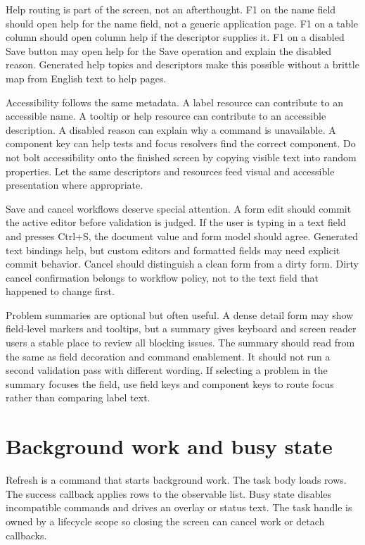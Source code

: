 Help routing is part of the screen, not an afterthought. F1 on the name field
should open help for the name field, not a generic application page. F1 on a
table column should open column help if the descriptor supplies it. F1 on a
disabled Save button may open help for the Save operation and explain the
disabled reason. Generated help topics and descriptors make this possible
without a brittle map from English text to help pages.

Accessibility follows the same metadata. A label resource can contribute to an
accessible name. A tooltip or help resource can contribute to an accessible
description. A disabled reason can explain why a command is unavailable. A
component key can help tests and focus resolvers find the correct component.
Do not bolt accessibility onto the finished screen by copying visible text into
random properties. Let the same descriptors and resources feed visual and
accessible presentation where appropriate.

Save and cancel workflows deserve special attention. A form edit should commit
the active editor before validation is judged. If the user is typing in a text
field and presses Ctrl+S, the document value and form model should agree.
Generated text bindings help, but custom editors and formatted fields may need
explicit commit behavior. Cancel should distinguish a clean form from a dirty
form. Dirty cancel confirmation belongs to workflow policy, not to the text
field that happened to change first.

Problem summaries are optional but often useful. A dense detail form may show
field-level markers and tooltips, but a summary gives keyboard and screen
reader users a stable place to review all blocking issues. The summary should
read from the same  as field decoration and command
enablement. It should not run a second validation pass with different wording.
If selecting a problem in the summary focuses the field, use field keys and
component keys to route focus rather than comparing label text.

\section{Background work and busy state}

Refresh is a command that starts background work. The task body loads rows.
The success callback applies rows to the observable list. Busy state disables
incompatible commands and drives an overlay or status text. The task handle is
owned by a lifecycle scope so closing the screen can cancel work or detach
callbacks.

